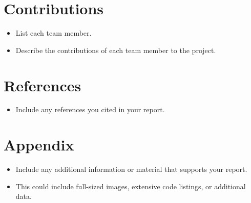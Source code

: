 \documentclass{article}
\begin{document}
\section{Contributions}
\label{sec:contributions}
\begin{itemize}
    \item List each team member.
    \item Describe the contributions of each team member to the project.
\end{itemize}

\section{References}
\label{sec:references}
\begin{itemize}
    \item Include any references you cited in your report.
\end{itemize}

\section{Appendix}
\label{sec:appendix}
\begin{itemize}
    \item Include any additional information or material that supports your
          report.
    \item This could include full-sized images, extensive code listings, or
          additional data.
\end{itemize}
\end{document}
